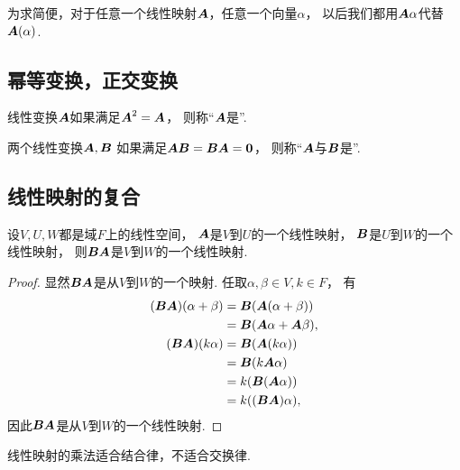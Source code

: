 为求简便，对于任意一个线性映射\(\boldsymbol{A}\)，任意一个向量\(\alpha\)，
以后我们都用\(\boldsymbol{A}\alpha\)代替\(\boldsymbol{A}(\alpha)\).

\subsection{幂等变换，正交变换}
\begin{definition}
线性变换\(\boldsymbol{A}\)如果满足\(\boldsymbol{A}^2=\boldsymbol{A}\)，
则称“\(\boldsymbol{A}\)是”.
\end{definition}

\begin{definition}
两个线性变换\(\boldsymbol{A},\boldsymbol{B}\)
如果满足\(\boldsymbol{A} \boldsymbol{B}=\boldsymbol{B} \boldsymbol{A}=\boldsymbol0\)，
则称“\(\boldsymbol{A}\)与\(\boldsymbol{B}\)是”.
\end{definition}

\subsection{线性映射的复合}
\begin{proposition}
设\(V,U,W\)都是域\(F\)上的线性空间，
\(\boldsymbol{A}\)是\(V\)到\(U\)的一个线性映射，
\(\boldsymbol{B}\)是\(U\)到\(W\)的一个线性映射，
则\(\boldsymbol{B}\boldsymbol{A}\)是\(V\)到\(W\)的一个线性映射.
\begin{proof}
显然\(\boldsymbol{B}\boldsymbol{A}\)是从\(V\)到\(W\)的一个映射.
任取\(\alpha,\beta \in V,
k \in F\)，
有\begin{align*}
	(\boldsymbol{B}\boldsymbol{A})(\alpha+\beta)
	&= \boldsymbol{B}(\boldsymbol{A}(\alpha+\beta)) \\
	&= \boldsymbol{B}(\boldsymbol{A}\alpha+\boldsymbol{A}\beta), \\
	(\boldsymbol{B}\boldsymbol{A})(k\alpha)
	&= \boldsymbol{B}(\boldsymbol{A}(k \alpha)) \\
	&= \boldsymbol{B}(k \boldsymbol{A}\alpha) \\
	&= k(\boldsymbol{B}(\boldsymbol{A}\alpha)) \\
	&= k((\boldsymbol{B}\boldsymbol{A}) \alpha),
\end{align*}
因此\(\boldsymbol{B}\boldsymbol{A}\)是从\(V\)到\(W\)的一个线性映射.
\end{proof}
\end{proposition}

\begin{proposition}
线性映射的乘法适合结合律，不适合交换律.
\end{proposition}

